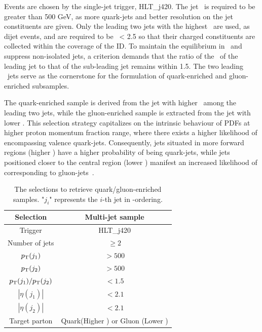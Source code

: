 Events are chosen by the single-jet trigger, HLT\_j420. The jet \pt~is  required to be greater than 500 GeV, as more quark-jets and better resolution on the jet constituents are given. Only the leading two jets with the highest \pt~are used, as dijet events, and are required to be  \abseta~< 2.5 so that their charged constituents are collected within the coverage of the ID. To maintain the equilibrium in \pt~and suppress non-isolated jets, a criterion demands that the ratio of the \pt~of the leading jet to that of the sub-leading jet remains within 1.5. The two leading \pt~jets serve as the cornerstone for the formulation of quark-enriched and gluon-enriched subsamples.

The quark-enriched sample is derived from the jet with higher \abseta~among the leading two jets, while the gluon-enriched sample is extracted from the jet with lower \abseta. This selection strategy capitalizes on the intrinsic behaviour of PDFs at higher proton momentum fraction range, where there exists a higher likelihood of encompassing valence quark-jets. Consequently, jets situated in more forward regions (higher \abseta) have a higher probability of being quark-jets, while jets positioned closer to the central region (lower \abseta) manifest an increased likelihood of corresponding to gluon-jets~\cite{ATLAS:2015rlw}.







\begin{table}[htb]
	\centering
	
\begin{tabular}{|c|c|}
	\hline
	Selection & Multi-jet sample  \\ 
	\hline
	 Trigger    & HLT\_j420 \\ 
	 Number of jets         & $\geq2$ \\ 
	 $p_{\mathrm{T}}(j_1)$             & $>500$ \\ 
	 $p_{\mathrm{T}}(j_2)$             & $>500$ \\ 
	 $p_{\mathrm{T}}(j_1)/p_{\mathrm{T}}(j_2)$   & $<1.5$ \\ 
	 $|\eta(j_1)|$         &  $<2.1$   \\ 
	 $|\eta(j_2)|$         &  $<2.1$   \\ \hline
	 Target parton         & Quark(Higher \abseta )  or Gluon (Lower \abseta )       \\
	\hline
\end{tabular}
\caption{
	The selections to retrieve quark/gluon-enriched samples.
	"$j_i$" represents the $i$-th jet in \pt-ordering.
}
\label{tab:QG-sample}
\end{table}


